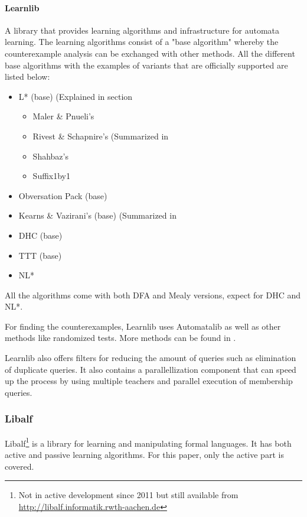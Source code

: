 \documentclass[multi,crop=false,class=article]{standalone}
\begin{document}
\paragraph{Learnlib} A library that provides learning algorithms and 
infrastructure for automata learning. The learning algorithms consist of a 
"base algorithm" whereby the counterexample analysis can be exchanged with 
other methods. All the different base algorithms with the examples of variants 
that are officially supported are listed below:

\begin{itemize}
	\item L* (base) (Explained in section %
	\begin{itemize}
		\item Maler \& Pnueli's \cite{Maler1995}
		\item Rivest \& Schapnire's (Summarized in 
		\item Shahbaz's \cite{Shahbaz2009}
		\item Suffix1by1 \cite{irfan2010}
	\end{itemize}
	\item Obversation Pack (base) \cite{howar2012a}
	\item Kearns \& Vazirani's (base) (Summarized in 
	\item DHC (base) \cite{Merten2012}
	\item TTT (base) %
	\item NL* \cite{Bollig2010}
\end{itemize}

All the algorithms come with both DFA and Mealy versions, expect for DHC and NL*.

For finding the counterexamples, Learnlib uses Automatalib as well as other 
methods like randomized tests. More methods can be found in \cite{Isberner2015}.

Learnlib also offers filters for reducing the amount of queries such as 
elimination of duplicate queries. %
It also contains a parallellization component that can speed up the process by 
using multiple teachers and parallel execution of membership 
queries\cite{Henrix15}\cite{Howar2012}. 

\subsubsection{Libalf}
\label{sssec:libalf}
Libalf\footnote{Not in active development since 2011 but still available 
from \url{http://libalf.informatik.rwth-aachen.de}} is a library for learning 
and manipulating formal languages. It has both active and passive learning 
algorithms. For this paper, only the active part is covered.
\end{document}
